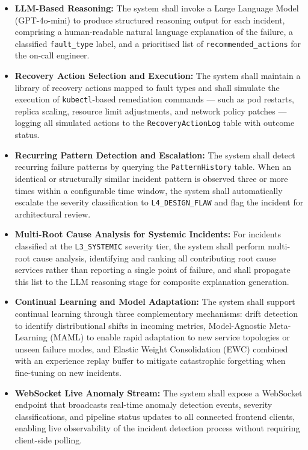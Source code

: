 \begin{itemize}
    \item \textbf{LLM-Based Reasoning:} The system shall invoke a Large Language Model (GPT-4o-mini) to produce structured reasoning output for each incident, comprising a human-readable natural language explanation of the failure, a classified \texttt{fault\_type} label, and a prioritised list of \texttt{recommended\_actions} for the on-call engineer.

    \item \textbf{Recovery Action Selection and Execution:} The system shall maintain a library of recovery actions mapped to fault types and shall simulate the execution of \texttt{kubectl}-based remediation commands — such as pod restarts, replica scaling, resource limit adjustments, and network policy patches — logging all simulated actions to the \texttt{RecoveryActionLog} table with outcome status.

    \item \textbf{Recurring Pattern Detection and Escalation:} The system shall detect recurring failure patterns by querying the \texttt{PatternHistory} table. When an identical or structurally similar incident pattern is observed three or more times within a configurable time window, the system shall automatically escalate the severity classification to \texttt{L4\_DESIGN\_FLAW} and flag the incident for architectural review.

    \item \textbf{Multi-Root Cause Analysis for Systemic Incidents:} For incidents classified at the \texttt{L3\_SYSTEMIC} severity tier, the system shall perform multi-root cause analysis, identifying and ranking all contributing root cause services rather than reporting a single point of failure, and shall propagate this list to the LLM reasoning stage for composite explanation generation.

    \item \textbf{Continual Learning and Model Adaptation:} The system shall support continual learning through three complementary mechanisms: drift detection to identify distributional shifts in incoming metrics, Model-Agnostic Meta-Learning (MAML) to enable rapid adaptation to new service topologies or unseen failure modes, and Elastic Weight Consolidation (EWC) combined with an experience replay buffer to mitigate catastrophic forgetting when fine-tuning on new incidents.

    \item \textbf{WebSocket Live Anomaly Stream:} The system shall expose a WebSocket endpoint that broadcasts real-time anomaly detection events, severity classifications, and pipeline status updates to all connected frontend clients, enabling live observability of the incident detection process without requiring client-side polling.


\end{itemize}
